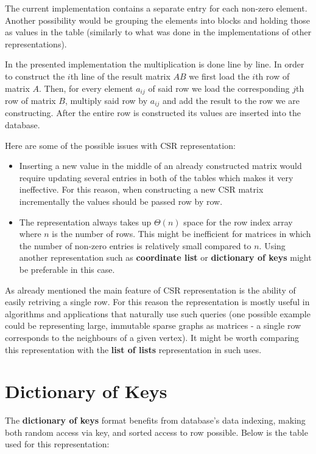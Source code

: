 \documentclass{article}
\begin{document}
The current implementation contains a separate entry for each non-zero element. Another possibility would be grouping the elements into blocks and holding those as values in the table (similarly to what was done in the implementations of other representations).

In the presented implementation the multiplication is done line by line. In order to construct the $i$th line of the result matrix $AB$ we first load the $i$th row of matrix $A$. Then, for every element $a_{ij}$ of said row we load the corresponding $j$th row of matrix $B$, multiply said row by $a_{ij}$ and add the result to the row we are constructing. After the entire row is constructed its values are inserted into the database.

Here are some of the possible issues with CSR representation:
\begin{itemize}
\item Inserting a new value in the middle of an already constructed matrix would require updating several entries in both of the tables which makes it very ineffective. For this reason, when constructing a new CSR matrix incrementally the values should be passed row by row.

\item The representation always takes up $\Theta(n)$ space for the row index array where $n$ is the number of rows. This might be inefficient for matrices in which the number of non-zero entries is relatively small compared to $n$. Using another representation such as \textbf{coordinate list} or \textbf{dictionary of keys} might be preferable in this case.
\end{itemize}

As already mentioned the main feature of CSR representation is the ability of easily retriving a single row. For this reason the representation is mostly useful in algorithms and applications that naturally use such queries (one possible example could be representing large, immutable sparse graphs as matrices - a single row corresponds to the neighbours of a given vertex). It might be worth comparing this representation with the \textbf{list of lists} representation in such uses.


\pagebreak
\section{Dictionary of Keys}

The \textbf{dictionary of keys} format benefits from database's data indexing, making both random access via key, and sorted access to row possible. Below is the table used for this representation:
\end{document}
